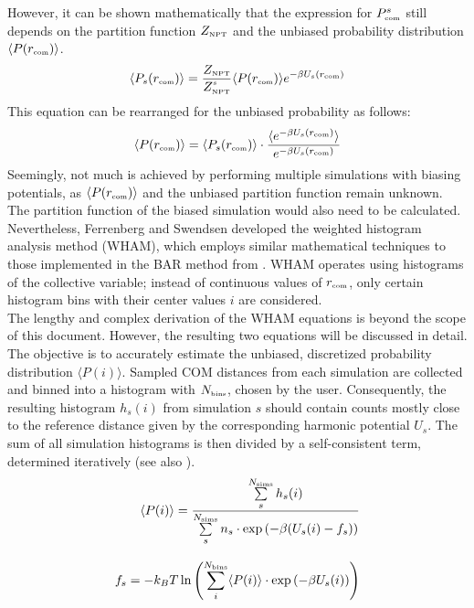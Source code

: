 \documentclass[9pt,tutorial]{livecoms}
\begin{document}
However, it can be shown mathematically that the expression for $P^s_\text{\tiny com}$ still depends on the partition function $Z_\text{\tiny NPT}$ and the unbiased probability distribution $\langle P(r_\text{\tiny com}) \rangle$.\cite{Kumar_1992}
\begin{align}
    \langle P_s(r_\text{\tiny com}) \rangle =  \frac{Z_\text{\tiny NPT}}{Z^{^s}_\text{\tiny NPT}} \langle P (r_\text{\tiny com}) \rangle e^{-\beta U_s(r_\text{\tiny com})}
\end{align}
This equation can be rearranged for the unbiased probability as follows:
\begin{align}
    \langle P(r_\text{\tiny com}) \rangle = \langle P_s (r_\text{\tiny com})\rangle \cdot \frac{\langle e^{-\beta U_s(r_\text{\tiny com})} \rangle}{e^{-\beta U_s(r_\text{\tiny com})}}
\end{align}
Seemingly, not much is achieved by performing multiple simulations with biasing potentials, as $\langle P(r_\text{\tiny com}) \rangle$ and the unbiased partition function remain unknown. The partition function of the biased simulation would also need to be calculated. Nevertheless, Ferrenberg and Swendsen\cite{Ferrenberg_1988} developed the weighted histogram analysis method (WHAM),\cite{Roux_1995} which employs similar mathematical techniques to those implemented in the BAR method from .\cite{Bennett1976} WHAM operates using histograms of the collective variable; instead of continuous values of $r_\text{\tiny com}$, only certain histogram bins with their center values $i$ are considered.\\
The lengthy and complex derivation of the WHAM equations is beyond the scope of this document. However, the resulting two equations will be discussed in detail. The objective is to accurately estimate the unbiased, discretized probability distribution $\langle P(i) \rangle$. Sampled COM distances from each simulation are collected and binned into a histogram with $N_\text{\tiny bins}$, chosen by the user. Consequently, the resulting histogram $h_s(i)$ from simulation $s$ should contain counts mostly close to the reference distance given by the corresponding harmonic potential $U_s$. The sum of all simulation histograms is then divided by a self-consistent term, determined iteratively (see also ).\cite{Hub_2010}
\begin{align}\label{eq:whamequations}
    \langle P(i) \rangle = \frac{\sum\limits_s^{N_\text{\tiny sims}} h_s(i)}{\sum\limits_s^{N_\text{\tiny sims}} n_s \cdot \exp\left(-\beta (U_s(i) - f_s)\right)}\\[0.3cm]
    f_s = -k_B T \ln \left( \sum_i^{N_\text{\tiny bins}} \langle P(i) \rangle \cdot \exp\left(-\beta U_s(i)\right) \right)
\end{align}
\end{document}
